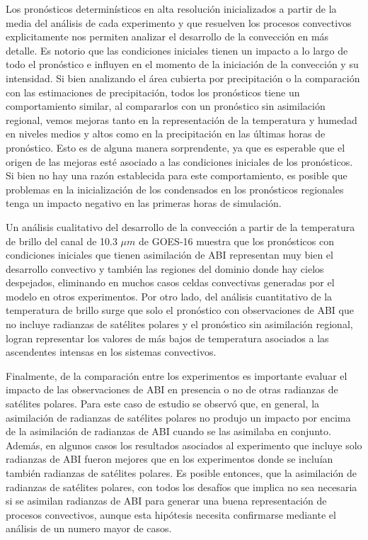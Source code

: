 \documentclass[12pt,oneside,a4paper]{reedthesis}
\begin{document}
Los pronósticos determinísticos en alta resolución inicializados a partir de la media del análisis de cada experimento y que resuelven los procesos convectivos explicitamente nos permiten analizar el desarrollo de la convección en más detalle. Es notorio que las condiciones iniciales tienen un impacto a lo largo de todo el pronóstico e influyen en el momento de la iniciación de la convección y su intensidad. Si bien analizando el área cubierta por precipitación o la comparación con las estimaciones de precipitación, todos los pronósticos tiene un comportamiento similar, al compararlos con un pronóstico sin asimilación regional, vemos mejoras tanto en la representación de la temperatura y humedad en niveles medios y altos como en la precipitación en las últimas horas de pronóstico. Esto es de alguna manera sorprendente, ya que es esperable que el origen de las mejoras esté asociado a las condiciones iniciales de los pronósticos. Si bien no hay una razón establecida para este comportamiento, es posible que problemas en la inicialización de los condensados en los pronósticos regionales tenga un impacto negativo en las primeras horas de simulación.

Un análisis cualitativo del desarrollo de la convección a partir de la temperatura de brillo del canal de 10.3 \(\mu m\) de GOES-16 muestra que los pronósticos con condiciones iniciales que tienen asimilación de ABI representan muy bien el desarrollo convectivo y también las regiones del dominio donde hay cielos despejados, eliminando en muchos casos celdas convectivas generadas por el modelo en otros experimentos. Por otro lado, del análisis cuantitativo de la temperatura de brillo surge que solo el pronóstico con observaciones de ABI que no incluye radianzas de satélites polares y el pronóstico sin asimilación regional, logran representar los valores de más bajos de temperatura asociados a las ascendentes intensas en los sistemas convectivos.

Finalmente, de la comparación entre los experimentos es importante evaluar el impacto de las observaciones de ABI en presencia o no de otras radianzas de satélites polares. Para este caso de estudio se observó que, en general, la asimilación de radianzas de satélites polares no produjo un impacto por encima de la asimilación de radianzas de ABI cuando se las asimilaba en conjunto. Además, en algunos casos los resultados asociados al experimento que incluye solo radianzas de ABI fueron mejores que en los experimentos donde se incluían también radianzas de satélites polares. Es posible entonces, que la asimilación de radianzas de satélites polares, con todos los desafíos que implica no sea necesaria si se asimilan radianzas de ABI para generar una buena representación de procesos convectivos, aunque esta hipótesis necesita confirmarse mediante el análisis de un numero mayor de casos.
\end{document}
